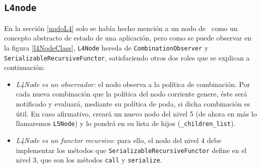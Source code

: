 		\subsection{\texttt{L4node}}
			En la secci\'on \ref{nodoL4} solo se hab\'ia hecho menci\'on a un nodo de \combeng \ como un concepto abstracto de estado de una aplicaci\'on, pero 
			como se puede observar en la figura \ref{l4NodeClass}, \texttt{L4Node} hereda de \texttt{CombinationObserver} y \texttt{SerializableRecursiveFunctor}, 
			satisfaciendo otros dos roles que se explican a continuaci\'on:
			\begin{itemize}
				\item\textit{L4Node es un observador:} el nodo observa a la pol\'itica de combinaci\'on. 
				Por cada nueva combinaci\'on que la pol\'itica del nodo corriente genere, \'este ser\'a notificado y evaluar\'a, mediante su pol\'itica de poda,
        si dicha combinaci\'on es \'util. En caso afirmativo, crear\'a un nuevo nodo del nivel 5 (de ahora en m\'as lo llamaremos \texttt{L5Node}) y lo
        pondr\'a en su lista de hijos (\texttt{\_children\_list}).
				\item\textit{L4Node es un functor recursivo:} para ello, el nodo del nivel 4 debe implementar los m\'etodos que \texttt
				{SerializableRecursiveFunctor} define en el nivel 3, que son los m\'etodos \texttt{call} y \texttt{serialize}.
\end{itemize}

